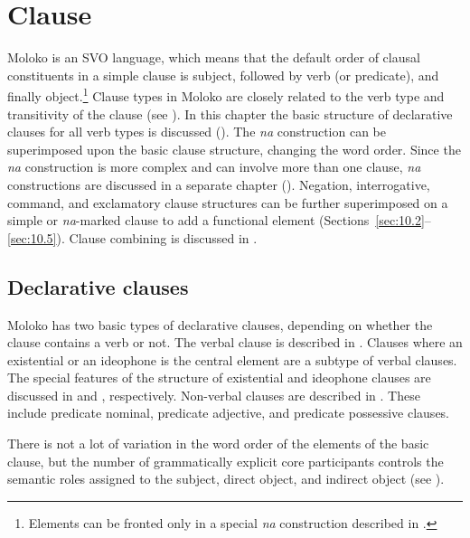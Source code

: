 \chapter[Clause]{Clause}\label{chap:10}
\hypertarget{RefHeading1212801525720847}{}
Moloko is an SVO language, which means that the default order of clausal constituents in a simple clause is subject, followed by verb (or predicate), and finally object.\footnote{Elements can be fronted only in a special \textit{na} construction described in .}  Clause types in Moloko are closely related to the verb type and transitivity of the clause (see ). In this chapter the basic structure of declarative clauses for all verb types is discussed (). The \textit{na} construction can be superimposed upon the basic clause structure, changing the word order. Since the \textit{na} construction is more complex and can involve more than one clause, \textit{na} constructions are discussed in a separate chapter (). Negation, interrogative, command, and exclamatory clause structures can be further superimposed on a simple or \textit{na}-marked clause to add a functional element (Sections~\ref{sec:10.2}--\ref{sec:10.5}). Clause combining is discussed in .

\section{Declarative clauses}\label{sec:10.1}
\hypertarget{RefHeading1212841525720847}{}
Moloko has two basic types of declarative clauses, depending on whether the clause contains a verb or not. The verbal clause is described in . Clauses where an existential or an ideophone is the central element are a subtype of verbal clauses.  The special features of the structure of existential and ideophone clauses are discussed in  and , respectively. Non-verbal clauses are described in . These include predicate nominal, predicate adjective, and predicate possessive clauses.  

There is not a lot of variation in the word order of the elements of the basic clause, but the number of grammatically explicit core participants controls the semantic roles assigned to the subject, direct object, and indirect object (see ).  

\largerpage
